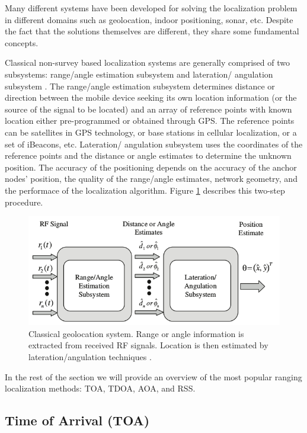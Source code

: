 Many different systems have been developed for solving the localization problem in different domains such as geolocation, indoor positioning, sonar, etc. Despite the fact that the  solutions themselves are different, they share some fundamental concepts.

Classical non-survey based localization systems  are generally comprised of two subsystems: range/angle estimation subsystem and lateration/
angulation subsystem \cite{GeoLoc}. The range/angle estimation subsystem determines distance or direction between the  mobile device seeking its own location information (or the source of the signal to be located) and an array of reference points with known location  either pre-programmed or obtained through GPS. The reference points can be satellites in GPS technology, or base stations in cellular localization, or a set of iBeacons, etc. Lateration/
angulation subsystem uses the coordinates of the reference points and the distance or angle estimates to determine the unknown position.  The accuracy of the positioning depends on the accuracy of the anchor nodes’ position, the quality of the range/angle estimates, network geometry, and the performace of the localization algorithm. Figure \ref{fig:2step} describes this two-step procedure.


\begin{figure}[h]
\centering
\includegraphics[width=1.0\textwidth]{figures/localization_example.png}
\caption{Classical geolocation system. Range or angle information is extracted from received RF signals. Location is then estimated by lateration/angulation techniques \cite{GeoLoc}.}
\label{fig:2step}
\end{figure}



In the rest of the section we will provide an overview of the most popular ranging localization methods: TOA, TDOA, AOA, and RSS.



\subsection{Time of Arrival (TOA)}

